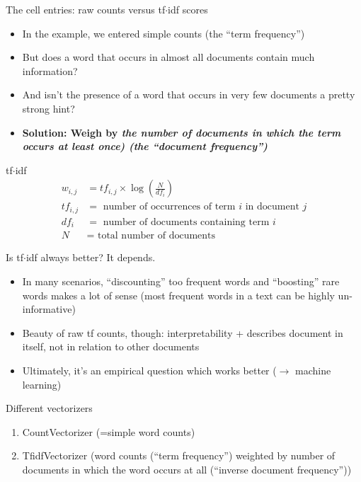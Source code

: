 \documentclass[compress]{beamer}
\begin{document}
\begin{frame}{The cell entries: raw counts versus tf$\cdot$idf scores}
	\begin{itemize}
		\item In the example, we entered simple counts (the ``term frequency'')
		\item But does a word that occurs in almost all documents contain much information?
		\item And isn't the presence of a word that occurs in very few documents a pretty strong hint?
		\item<2-> \textbf{Solution: Weigh by \emph{the number of documents in which the term occurs at least once) (the ``document frequency'')}} 
	\end{itemize}
\end{frame}

\begin{frame}{tf$\cdot$idf}
\begin{align*}
  w_{i,j} &= tf_{i,j} \times \log \left(\frac{N}{df_{i}}\right) \\[1em]
  tf_{i,j} &= \text{ number of occurrences of term $i$ in document $j$} \\[0.5em]
  df_{i}  &= \text{ number of documents containing term $i$} \\[0.5em]
  N       &= \text{ total number of documents}
\end{align*}
\end{frame}



\begin{frame}{Is tf$\cdot$idf always better?}
It depends.

\begin{itemize}
	\item In many scenarios,  ``discounting'' too frequent words and ``boosting'' rare words makes a lot of sense (most frequent words in a text can be highly un-informative)
	\item Beauty of raw tf counts, though: interpretability + describes document in itself, not in relation to other documents
 	\item Ultimately, it's an empirical question which works better ($\rightarrow$ machine learning)
\end{itemize}
\end{frame}


\begin{frame}{Different vectorizers}
\begin{enumerate}[<+->]
	\item CountVectorizer (=simple word counts)
	\item TfidfVectorizer (word counts (``term frequency'') weighted by number of documents in which the word occurs at all (``inverse document frequency''))
\end{enumerate}
\end{frame}
\end{document}
